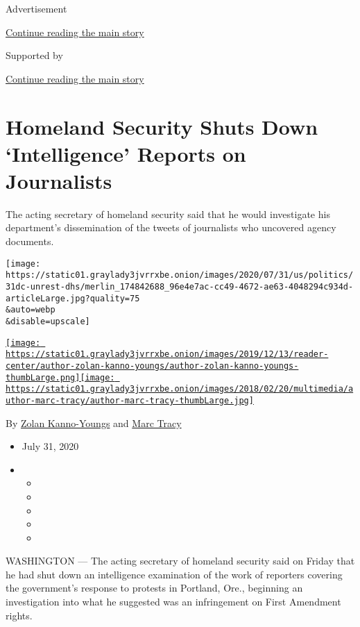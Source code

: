 Advertisement

\protect\hyperlink{after-top}{Continue reading the main story}

Supported by

\protect\hyperlink{after-sponsor}{Continue reading the main story}

\hypertarget{homeland-security-shuts-down-intelligence-reports-on-journalists}{%
\section{Homeland Security Shuts Down `Intelligence' Reports on
Journalists}\label{homeland-security-shuts-down-intelligence-reports-on-journalists}}

The acting secretary of homeland security said that he would investigate
his department's dissemination of the tweets of journalists who
uncovered agency documents.

\texttt{[image: https://static01.graylady3jvrrxbe.onion/images/2020/07/31/us/politics/31dc-unrest-dhs/merlin\_174842688\_96e4e7ac-cc49-4672-ae63-4048294c934d-articleLarge.jpg?quality=75\\\&auto=webp\\\&disable=upscale]}

\href{https://www.nytimes3xbfgragh.onion/by/zolan-kanno-youngs}{\texttt{[image: https://static01.graylady3jvrrxbe.onion/images/2019/12/13/reader-center/author-zolan-kanno-youngs/author-zolan-kanno-youngs-thumbLarge.png]}}\href{https://www.nytimes3xbfgragh.onion/by/marc-tracy}{\texttt{[image: https://static01.graylady3jvrrxbe.onion/images/2018/02/20/multimedia/author-marc-tracy/author-marc-tracy-thumbLarge.jpg]}}

By \href{https://www.nytimes3xbfgragh.onion/by/zolan-kanno-youngs}{Zolan
Kanno-Youngs} and
\href{https://www.nytimes3xbfgragh.onion/by/marc-tracy}{Marc Tracy}

\begin{itemize}
\item
  July 31, 2020
\item
  \begin{itemize}
  \item
  \item
  \item
  \item
  \item
  \end{itemize}
\end{itemize}

WASHINGTON --- The acting secretary of homeland security said on Friday
that he had shut down an intelligence examination of the work of
reporters covering the government's response to protests in Portland,
Ore., beginning an investigation into what he suggested was an
infringement on First Amendment rights.

